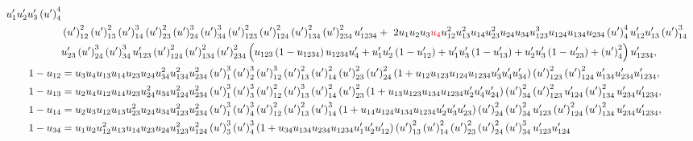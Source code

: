 \documentclass[hidelinks,12pt]{article}
\begin{document}
{{\begin{align*}
   u'_1 u'_2 u'_3 \left(u'\right)_4^4 \nonumber\\ &\left(u'\right)_{12}^2
   \left(u'\right)_{13}^2 \left(u'\right)_{14}^3
   \left(u'\right)_{23}^2 \left(u'\right)_{24}^3
   \left(u'\right)_{34}^3 \left(u'\right)_{123}^2
   \left(u'\right)_{124}^2 \left(u'\right)_{134}^2
   \left(u'\right)_{234}^2 u'_{1234}+~2 u_1 u_2 u_3 \textcolor{red}{u_4} u_{12}^2
   u_{13}^2 u_{14} u_{23}^2 u_{24} u_{34} u_{123}^3 u_{124}
   u_{134} u_{234} \left(u'\right)_4^4 u'_{12} u'_{13}
   \left(u'\right)_{14}^3 \nonumber\\ &u'_{23} \left(u'\right)_{24}^3
   \left(u'\right)_{34}^3 u'_{123} \left(u'\right)_{124}^2
   \left(u'\right)_{134}^2 \left(u'\right)_{234}^2 \left(u_{123}
   \left(1-u_{1234}\right) u_{1234} u'_4+u'_1 u'_2
   \left(1-u'_{12}\right)+u'_1 u'_3 \left(1-u'_{13}\right)+u'_2 u'_3
   \left(1-u'_{23}\right)+\left(u'\right)_4^2\right) u'_{1234},\nonumber \\
    1-u_{12}&= u_3 u_4
   u_{13} u_{14} u_{23} u_{24} u_{34}^2 u_{134}^2 u_{234}^2 \left(u'\right)_1^3
   \left(u'\right)_2^3 \left(u'\right)_{12}^3 \left(u'\right)_{13}^2
   \left(u'\right)_{14}^2 \left( u'\right)_{23}^2 \left(u'\right)_{24}^2 \left(1+u_{12}
   u_{123} u_{124} u_{1234} u'_3 u'_4 u'_{34}\right) \left(u'\right)_{123}^2
   \left(u'\right)_{124}^2 u'_{134} u'_{234} u'_{1234},\nonumber \\
     1-u_{13}&=u_2 u_4 u_{12}
   u_{14} u_{23} u_{24}^2 u_{34} u_{124}^2 u_{234}^2 \left(u'\right)_1^3
   \left(u'\right)_3^3 \left(u'\right)_{12}^2 \left(u'\right)_{13}^3
   \left(u'\right)_{14}^2 \left(u'\right)_{23}^2 \left(1+ u_{13} u_{123} u_{134} u_{1234}
   u'_2 u'_4 u'_{24}\right) \left(u'\right)_{34}^2 \left(u'\right)_{123}^2 u'_{124}
   \left(u'\right)_{134}^2 u'_{234} u'_{1234},\nonumber \\ 
   1-u_{14}&= u_2 u_3 u_{12} u_{13} u_{23}^2 u_{24} u_{34} u_{123}^2 u_{234}^2
   \left(u'\right)_1^3 \left(u'\right)_4^3 \left(u'\right)_{12}^2 \left(u'\right)_{13}^2
   \left(u'\right)_{14}^3 \left(1+ u_{14} u_{124} u_{134} u_{1234} u'_2 u'_3
   u'_{23}\right) \left(u'\right)_{24}^2 \left(u'\right)_{34}^2 u'_{123}
   \left(u'\right)_{124}^2 \left(u'\right)_{134}^2 u'_{234} u'_{1234}, \nonumber \\ 
    1-u_{34}&= u_1 u_2 u_{12}^2 u_{13}
   u_{14} u_{23} u_{24} u_{123}^2 u_{124}^2 \left(u'\right)_3^3 \left(u'\right)_4^3
   \left(1+u_{34} u_{134} u_{234} u_{1234} u'_1 u'_2 u'_{12}\right)
   \left(u'\right)_{13}^2 \left(u'\right)_{14}^2 \left(u'\right)_{23}^2
   \left(u'\right)_{24}^2 \left(u'\right)_{34}^3 u'_{123} u'_{124}

\end{align*}}}
\end{document}

